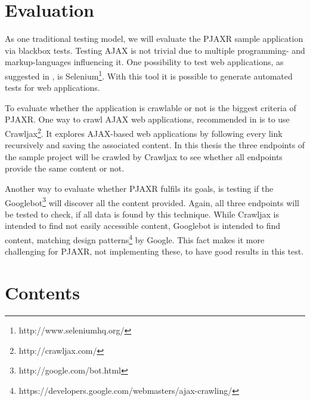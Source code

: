 \documentclass[f,bachelor,binding,twoside,palatino]{WeSTthesis}
\def \ajax {AJAX}
\def \pjaxr {PJAXR}
\begin{document}
\section{Evaluation}
  As one traditional testing model, we will evaluate the \pjaxr{} sample application via blackbox tests.
  Testing \ajax{} is not trivial due to multiple programming- and markup-languages influencing it. 
  One possibility to test web applications, as suggested in \cite{lundmark11}, is Selenium\footnote{http://www.seleniumhq.org/}.
  With this tool it is possible to generate automated tests for web applications.
  
  To evaluate whether the application is crawlable or not is the biggest criteria of \pjaxr{}.
  One way to crawl \ajax{} web applications, recommended in \cite{crawljax:tweb12} is to use Crawljax\footnote{http://crawljax.com/}. 
  It explores \ajax{}-based web applications by following every link recursively and saving the associated content. In this thesis the three endpoints of the sample project will be crawled by Crawljax to see whether all endpoints provide the same content or not.
  
  Another way to evaluate whether \pjaxr{} fulfils its goals, is testing if the Googlebot\footnote{http://google.com/bot.html} will discover all the content provided.
  Again, all three endpoints will be tested to check, if all data is found by this technique.
  While Crawljax is intended to find not easily accessible content, Googlebot is intended to find content, matching design patterns\footnote{https://developers.google.com/webmasters/ajax-crawling/} by Google. This fact makes it more challenging for \pjaxr{}, not implementing these, to have good results in this test.

\section{Contents}
\end{document}

